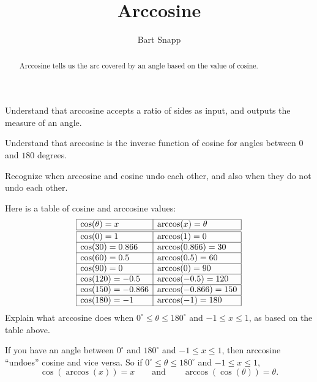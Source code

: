 \documentclass[noauthor,nooutcomes,12pt,handout,hints]{ximera}
\title{Arccosine} \author{Bart Snapp}
\begin{document}
\begin{abstract}
  Arccosine tells us the arc covered by an angle based on the value of
  cosine.
\end{abstract}
\maketitle

\begin{listOutcomes}
\item Understand that arccosine accepts a ratio of sides as input, and
  outputs the measure of an angle.
\item Understand that arccosine is the inverse function of cosine for
  angles between $0$ and $180$ degrees.
\item Recognize when arccosine and cosine undo each other, and also
  when they do not undo each other.
\end{listOutcomes}
\mynewpage




\begin{question}
  Here is a table of cosine and arccosine values:
  \[
  \begin{array}{|l|l|} \hline
    \cos(\theta)  = x     & \arccos(x) = \theta \\ \hline\hline
    \cos(0)  = 1     & \arccos(1) = 0 \\ \hline
    \cos(30) = 0.866 & \arccos(0.866) = 30\\ \hline
    \cos(60) = 0.5 & \arccos(0.5) = 60\\ \hline
    \cos(90) = 0 & \arccos(0) = 90\\ \hline
    \cos(120) = -0.5 & \arccos(-0.5) = 120\\ \hline
    \cos(150) = -0.866 & \arccos(-0.866) = 150\\ \hline
    \cos(180) =-1 & \arccos(-1) = 180  \\\hline
  \end{array}
  \]
  Explain what arccosine does when $0^\circ \le \theta \le 180^\circ$
  and $-1\le x\le 1$, as based on the table above.
  \begin{freeResponse}
    If you have an angle between $0^\circ$ and $180^\circ$ and $-1\le
    x\le 1$, then arccosine ``undoes'' cosine and vice versa. So if
    $0^\circ \le \theta \le 180^\circ$ and $-1\le x\le 1$,
    \[
    \cos(\arccos(x)) = x\qquad\text{and}\qquad \arccos(\cos(\theta)) =
    \theta.
    \]
  \end{freeResponse}
\end{question}
\mynewpage
\end{document}
